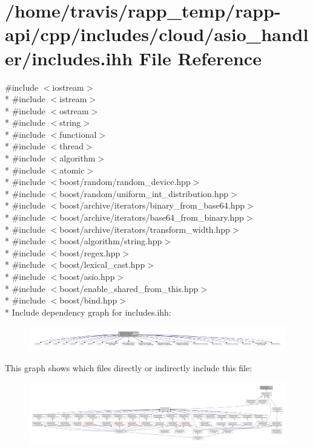 \hypertarget{cloud_2asio__handler_2includes_8ihh}{\section{/home/travis/rapp\-\_\-temp/rapp-\/api/cpp/includes/cloud/asio\-\_\-handler/includes.ihh File Reference}
\label{cloud_2asio__handler_2includes_8ihh}
}
{\ttfamily \#include $<$iostream$>$}\\*
{\ttfamily \#include $<$istream$>$}\\*
{\ttfamily \#include $<$ostream$>$}\\*
{\ttfamily \#include $<$string$>$}\\*
{\ttfamily \#include $<$functional$>$}\\*
{\ttfamily \#include $<$thread$>$}\\*
{\ttfamily \#include $<$algorithm$>$}\\*
{\ttfamily \#include $<$atomic$>$}\\*
{\ttfamily \#include $<$boost/random/random\-\_\-device.\-hpp$>$}\\*
{\ttfamily \#include $<$boost/random/uniform\-\_\-int\-\_\-distribution.\-hpp$>$}\\*
{\ttfamily \#include $<$boost/archive/iterators/binary\-\_\-from\-\_\-base64.\-hpp$>$}\\*
{\ttfamily \#include $<$boost/archive/iterators/base64\-\_\-from\-\_\-binary.\-hpp$>$}\\*
{\ttfamily \#include $<$boost/archive/iterators/transform\-\_\-width.\-hpp$>$}\\*
{\ttfamily \#include $<$boost/algorithm/string.\-hpp$>$}\\*
{\ttfamily \#include $<$boost/regex.\-hpp$>$}\\*
{\ttfamily \#include $<$boost/lexical\-\_\-cast.\-hpp$>$}\\*
{\ttfamily \#include $<$boost/asio.\-hpp$>$}\\*
{\ttfamily \#include $<$boost/enable\-\_\-shared\-\_\-from\-\_\-this.\-hpp$>$}\\*
{\ttfamily \#include $<$boost/bind.\-hpp$>$}\\*
Include dependency graph for includes.\-ihh\-:
\nopagebreak
\begin{figure}[H]
\begin{center}
\leavevmode
\includegraphics[width=350pt]{cloud_2asio__handler_2includes_8ihh__incl}
\end{center}
\end{figure}
This graph shows which files directly or indirectly include this file\-:
\nopagebreak
\begin{figure}[H]
\begin{center}
\leavevmode
\includegraphics[width=350pt]{cloud_2asio__handler_2includes_8ihh__dep__incl}
\end{center}
\end{figure}
